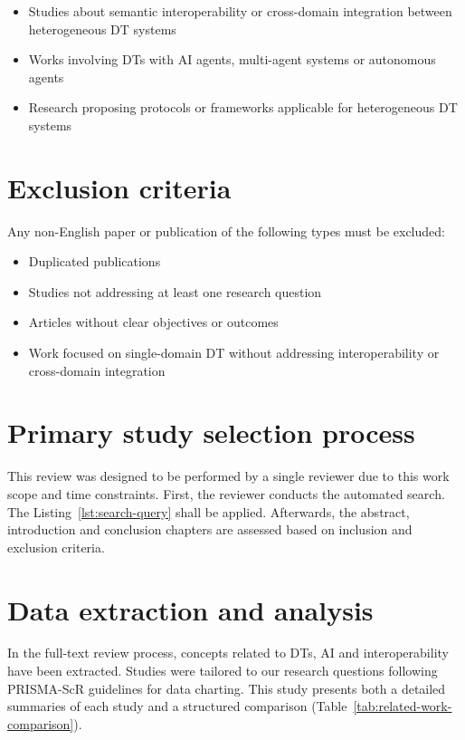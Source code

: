 \begin{itemize}
    \item Studies about semantic interoperability or cross-domain integration between heterogeneous DT systems
    \item Works involving DTs with AI agents, multi-agent systems or autonomous agents
    \item Research proposing protocols or frameworks applicable for heterogeneous DT systems
\end{itemize}

\section{Exclusion criteria}

Any non-English paper or publication of the following types must be excluded:

\begin{itemize}
    \item Duplicated publications
    \item Studies not addressing at least one research question
    \item Articles without clear objectives or outcomes
    \item Work focused on single-domain DT without addressing interoperability or cross-domain integration
\end{itemize}

\section{Primary study selection process}

This review was designed to be performed by a single reviewer due to this work scope and time constraints.
First, the reviewer conducts the automated search. The Listing~\ref{lst:search-query} shall be applied.
Afterwards, the abstract, introduction and conclusion chapters are assessed
    based on inclusion and exclusion criteria.

\section{Data extraction and analysis}

In the full-text review process, concepts related to DTs, AI and interoperability have been extracted.
Studies were tailored to our research questions following PRISMA-ScR guidelines for data charting.
This study presents both a detailed summaries of each study and a 
    structured comparison (Table~\ref{tab:related-work-comparison}).

